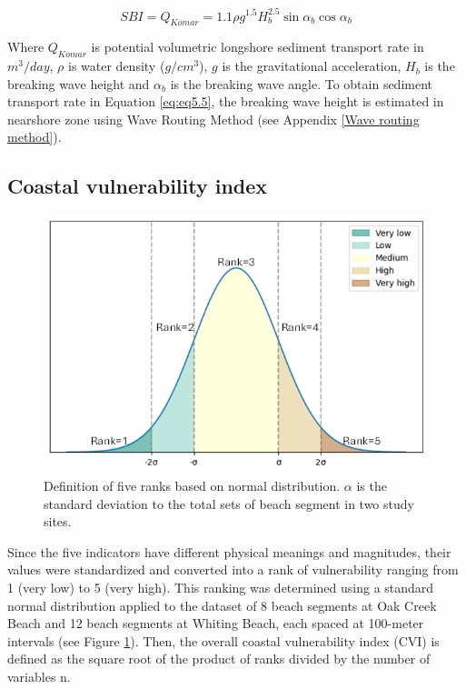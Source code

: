 \begin{equation}
    SBI = Q_{Komar} = 1.1 \rho g^{1.5} H_b^{2.5}\sin\alpha_b\cos\alpha_b
\end{equation}
\label{eq:eq5.5}

Where $Q_{Komar}$ is potential volumetric longshore sediment transport rate in
$m^3/day$, $\rho$ is water density ($g/cm^3$), $g$ is the gravitational
acceleration, $H_b$ is the breaking wave height and $\alpha_b$ is the breaking
wave angle. To obtain sediment transport rate in Equation \ref{eq:eq5.5}, the 
breaking wave height is estimated in nearshore zone using Wave Routing Method
(see Appendix \ref{Wave routing method}).

\subsection{Coastal vulnerability index}
\label{Coastal vulnerability index}

\begin{figure}[htbp]
  \centering
  \includegraphics[width=1\textwidth]{chapter5/resources/five_ranks.png}
  \caption{Definition of five ranks based on normal distribution. $\alpha$ is the
  standard deviation to the total sets of beach segment in two study sites.}
  \label{fig:five_ranks}
\end{figure}

Since the five indicators have different physical meanings and magnitudes, their
values were standardized and converted into a rank of vulnerability ranging from
1 (very low) to 5 (very high). This ranking was determined using a standard
normal distribution applied to the dataset of 8 beach segments at Oak Creek
Beach and 12 beach segments at Whiting Beach, each spaced at 100-meter intervals
(see Figure \ref{fig:five_ranks}). Then, the overall coastal vulnerability index (CVI) is defined
as the square root of the product of ranks divided by the number of variables n.

